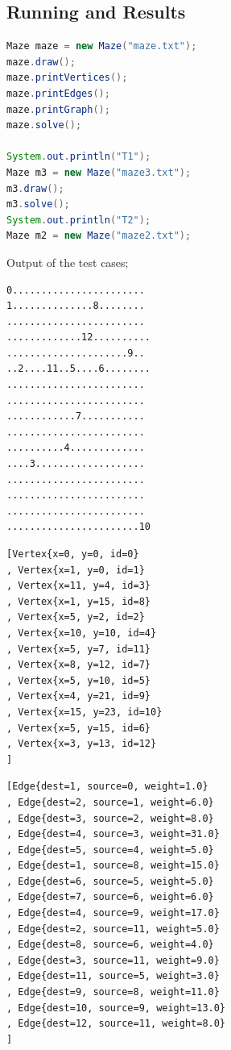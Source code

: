 \documentclass[a4paper]{article}
\begin{document}
\begin{large}
  \section{Running and Results}

  \begin{lstlisting}[language=Java, caption=Testing methods in main method]
Maze maze = new Maze("maze.txt");
maze.draw();
maze.printVertices();
maze.printEdges();
maze.printGraph();
maze.solve();

System.out.println("T1");
Maze m3 = new Maze("maze3.txt");
m3.draw();
m3.solve();
System.out.println("T2");
Maze m2 = new Maze("maze2.txt");
  \end{lstlisting}

  \newpage

  Output of the test cases;


\begin{lstlisting}[caption=Visual representation of found vertices in maze]
0.......................
1..............8........
........................
.............12..........
.....................9..
..2....11..5....6........
........................
........................
............7...........
........................
..........4.............
....3...................
........................
........................
........................
.......................10
\end{lstlisting}

\begin{lstlisting}[caption= Coordinates and id's of vertices]
[Vertex{x=0, y=0, id=0}
, Vertex{x=1, y=0, id=1}
, Vertex{x=11, y=4, id=3}
, Vertex{x=1, y=15, id=8}
, Vertex{x=5, y=2, id=2}
, Vertex{x=10, y=10, id=4}
, Vertex{x=5, y=7, id=11}
, Vertex{x=8, y=12, id=7}
, Vertex{x=5, y=10, id=5}
, Vertex{x=4, y=21, id=9}
, Vertex{x=15, y=23, id=10}
, Vertex{x=5, y=15, id=6}
, Vertex{x=3, y=13, id=12}
]
\end{lstlisting}


\begin{lstlisting}[caption=Visual representation of found vertices in maze]
[Edge{dest=1, source=0, weight=1.0}
, Edge{dest=2, source=1, weight=6.0}
, Edge{dest=3, source=2, weight=8.0}
, Edge{dest=4, source=3, weight=31.0}
, Edge{dest=5, source=4, weight=5.0}
, Edge{dest=1, source=8, weight=15.0}
, Edge{dest=6, source=5, weight=5.0}
, Edge{dest=7, source=6, weight=6.0}
, Edge{dest=4, source=9, weight=17.0}
, Edge{dest=2, source=11, weight=5.0}
, Edge{dest=8, source=6, weight=4.0}
, Edge{dest=3, source=11, weight=9.0}
, Edge{dest=11, source=5, weight=3.0}
, Edge{dest=9, source=8, weight=11.0}
, Edge{dest=10, source=9, weight=13.0}
, Edge{dest=12, source=11, weight=8.0}
]
\end{lstlisting}


\end{large}
\end{document}
